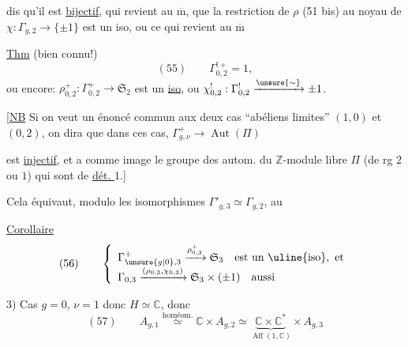  dis qu'il est \uline{bijectif}, 
qui revient au $\overline{\mathrm m}$, que la restriction de $\rho$ (51 bis) au noyau  de $\chi:\Gamma_{g,2}\longrightarrow\{\pm1\}$ est un iso, ou ce qui revient au $\overline{\mathrm m}$

\uline{Thm} (bien connu!)
\[
(55)\qquad\Gamma^{!+}_{0,2}=1,
\]
ou encore:
$\rho^+_{0,2}:\Gamma^+_{0,2}\longrightarrow\mathfrak S_2$ est un \uline{iso}, ou $\chi^!_{0,2}:\Gamma^!_{0,2}\xrightarrow{\unsure{\sim}}\pm1$.

[\uline{NB} Si on veut un énoncé commun aux  deux cas ``abéliens limites'' $(1,0)$ et $(0,2)$, on dira que dans ces cas, $\Gamma^+_{g,\nu}\longrightarrow\operatorname{Aut}(\Pi)$

est \uline{injectif}, et a comme image  le groupe des autom. du $\mathbb{Z}$-module libre $\Pi$ (de rg $2$ ou $1$) qui sont de \uline{dét. $1$}.]

Cela équivaut, modulo les isomorphismes $\Gamma'_{g,3}\simeq\Gamma_{g,2}$, au 

\uline{Corollaire}
\[
(56)\qquad\left\{\begin{array}{l}
\Gamma^+_{\unsure{g|0},3}\xrightarrow{\rho^+_{0,3}}\mathfrak S_3\quad\text{est un }\uline{\text{iso}},\text{ et}\\
\Gamma_{0,3}\xrightarrow{(\rho_{0,3},\chi_{0,3})}\mathfrak S_3\times(\pm1)\quad\text{aussi}
\end{array}\right.
\]


3) Cas $g=0$, $\nu=1$ donc $H\simeq\mathbb{C}$, donc
\[
(57)\qquad A_{g,1}\overset{\text{homéom.}}{\simeq}\mathbb{C}\times A_{g,2}\simeq\underbrace{\mathbb{C}\times\mathbb{C}^*}_{\operatorname{Aff}(1,\mathbb{C})}\times A_{g,3}
\]


